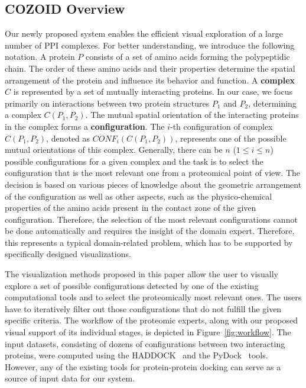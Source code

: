\documentclass{bmcart}
\begin{document}
\subsection*{COZOID Overview}
Our newly proposed system enables the efficient visual exploration of a large number of PPI complexes.
For better understanding, we introduce the following notation.
A protein $P$ consists of a set of amino acids forming the polypeptidic chain.
The order of these amino acids and their properties determine the spatial arrangement of the protein and influence its behavior and function.
A \textbf{complex} $C$ is represented by a set of mutually interacting proteins.
In our case, we focus primarily on interactions between two protein structures $P_1$ and $P_2$, determining a complex $C(P_1,P_2)$.
The mutual spatial orientation of the interacting proteins in the complex forms a \textbf{configuration}.
The $i$-th configuration of complex $C(P_1,P_2)$, denoted as $CONF_i(C(P_1,P_2))$, represents one of the possible mutual orientations of this complex.
Generally, there can be $n$ ($1 \leq i \leq n$) possible configurations for a given complex and the task is to select the configuration that is the most relevant one from a proteomical point of view.
The decision is based on various pieces of knowledge about the geometric arrangement of the configuration as well as other aspects, such as the physico-chemical properties of the amino acids present in the contact zone of the given configuration.
Therefore, the selection of the most relevant configurations cannot be done automatically and requires the insight of the domain expert.
Therefore, this represents a typical domain-related problem, which has to be supported by specifically designed visualizations.

The visualization methods proposed in this paper allow the user to visually explore a set of possible configurations detected by one of the existing computational tools and to select the proteomically most relevant ones.
The users have to iteratively filter out those configurations that do not fulfill the given specific criteria.
The workflow of the proteomic experts, along with our proposed visual support of its individual stages, is depicted in Figure~\ref{fig:workflow}.
The input datasets, consisting of dozens of configurations between two interacting proteins, were computed using the HADDOCK~\cite{haddock} and the PyDock~\cite{pydock} tools. 
However, any of the existing tools for protein-protein docking can serve as a source of input data for our system.
\end{document}
